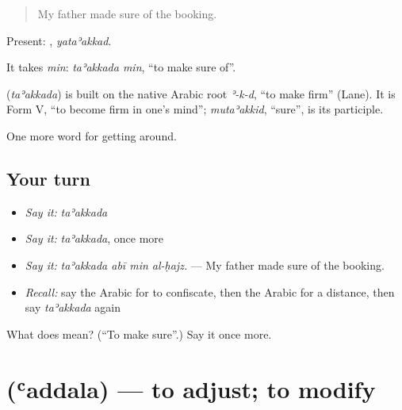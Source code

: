 \begin{quote}
My father made sure of the booking.
\end{quote}

Present: , \emph{yataʾakkad}.

It takes \emph{min}: \emph{taʾakkada min}, \textquotedblleft{}to make sure of\textquotedblright{}.

\begin{cousinweb}
\textbf{} (\emph{taʾakkada}) is built on the native Arabic root \emph{ʾ-k-d}, \textquotedblleft{}to make firm\textquotedblright{} (Lane). It is Form V, \textquotedblleft{}to become firm in one's mind\textquotedblright{}; \emph{mutaʾakkid}, \textquotedblleft{}sure\textquotedblright{}, is its participle.
\end{cousinweb}

\begin{grammarlens}[title={What you've built}]
One more word for getting around.
\end{grammarlens}

\subsection*{Your turn}
\begin{itemize}
\raggedright
  \item \emph{Say it:} \emph{taʾakkada}
  \item \emph{Say it:} \emph{taʾakkada}, once more
  \item \emph{Say it:} \emph{taʾakkada abī min al-ḥajz.} — My father made sure of the booking.
  \item \emph{Recall:} say the Arabic for to confiscate, then the Arabic for a distance, then say \emph{taʾakkada} again
\end{itemize}

\begin{tcolorbox}[breakable,colback=teal!4,colframe=teal!35!black,title={Before you move on}]
What does  mean? (\textquotedblleft{}To make sure\textquotedblright{}.) Say it once more.
\end{tcolorbox}
\section[\texorpdfstring{\ar{عدل} (ʿaddala)}{عدل (ʿaddala)}]{ (ʿaddala) — to adjust; to modify}

\label{lesson:AR-C427-addala}



